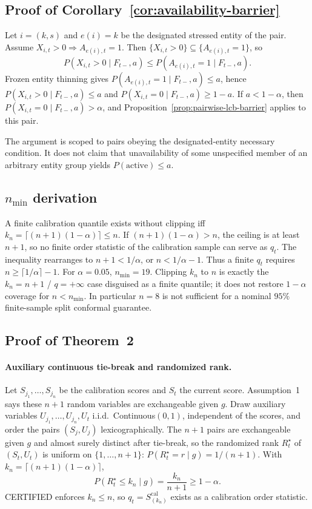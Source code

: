 \subsection{Proof of Corollary~\ref{cor:availability-barrier}}
\label{app:proof_availability_barrier}

Let $i=(k,s)$ and $e(i)=k$ be the designated stressed entity of the pair.
Assume $X_{i,t}>0\Rightarrow A_{e(i),t}=1$.  Then
$\{X_{i,t}>0\}\subseteq\{A_{e(i),t}=1\}$, so
\[
 P(X_{i,t}>0\mid F_{t-},a)
 \le
 P(A_{e(i),t}=1\mid F_{t-},a).
\]
Frozen entity thinning gives $P(A_{e(i),t}=1\mid F_{t-},a)\le a$, hence
$P(X_{i,t}>0\mid F_{t-},a)\le a$ and $P(X_{i,t}=0\mid F_{t-},a)\ge 1-a$.
If $a<1-\alpha$, then $P(X_{i,t}=0\mid F_{t-},a)>\alpha$, and
Proposition~\ref{prop:pairwise-lcb-barrier} applies to this pair.

The argument is scoped to pairs obeying the designated-entity necessary
condition.  It does not claim that unavailability of some unspecified member
of an arbitrary entity group yields $P(\mathrm{active})\le a$.

\subsection{$n_{\min}$ derivation}
\label{app:nmin}

A finite calibration quantile exists without clipping iff
$k_n=\lceil(n+1)(1-\alpha)\rceil\le n$.  If $(n+1)(1-\alpha)>n$, the ceiling is
at least $n+1$, so no finite order statistic of the calibration sample can
serve as $q_t$.  The inequality rearranges to $n+1<1/\alpha$, or
$n<1/\alpha-1$.  Thus a finite $q_t$ requires
$n\ge\lceil 1/\alpha\rceil-1$.  For $\alpha=0.05$, $n_{\min}=19$.  Clipping
$k_n$ to $n$ is exactly the $k_n=n+1$ / $q=+\infty$ case disguised as a finite
quantile; it does not restore $1-\alpha$ coverage for $n<n_{\min}$.  In
particular $n=8$ is not sufficient for a nominal $95\%$ finite-sample split
conformal guarantee.

\subsection{Proof of Theorem~2}
\label{app:proof_agg_lcb}

\paragraph{Auxiliary continuous tie-break and randomized rank.}
Let $S_{j_1},\ldots,S_{j_n}$ be the calibration scores and $S_t$ the current
score.  Assumption~1 says these $n+1$ random
variables are exchangeable given $g$.  Draw auxiliary variables
$U_{j_1},\ldots,U_{j_n},U_t$ i.i.d.\ Continuous$(0,1)$, independent of the
scores, and order the pairs $(S_j,U_j)$ lexicographically.  The $n+1$ pairs
are exchangeable given $g$ and almost surely distinct after tie-break, so the
randomized rank $R_t^\star$ of $(S_t,U_t)$ is uniform on $\{1,\ldots,n+1\}$:
$P(R_t^\star=r\mid g)=1/(n+1)$.  With
$k_n=\lceil(n+1)(1-\alpha)\rceil$,
\[
 P(R_t^\star\le k_n\mid g)=\frac{k_n}{n+1}\ge 1-\alpha.
\]
CERTIFIED enforces $k_n\le n$, so $q_t=S_{(k_n)}^{\mathrm{cal}}$ exists as a
calibration order statistic.

